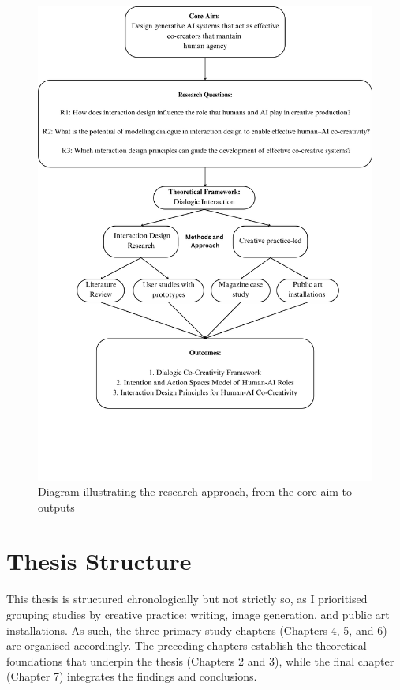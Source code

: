 \begin{figure}
    \centering
    \includegraphics[width=1\linewidth]{DiagramStructure.png}
    \caption{Diagram illustrating the research approach, from the core aim to outputs}
    \label{fig:approach_figure}
\end{figure}

\section{Thesis Structure}

This thesis is structured chronologically but not strictly so, as I prioritised grouping studies by creative practice: writing, image generation, and public art installations. As such, the three primary study chapters (Chapters 4, 5, and 6) are organised accordingly. The preceding chapters establish the theoretical foundations that underpin the thesis (Chapters 2 and 3), while the final chapter (Chapter 7) integrates the findings and conclusions.

